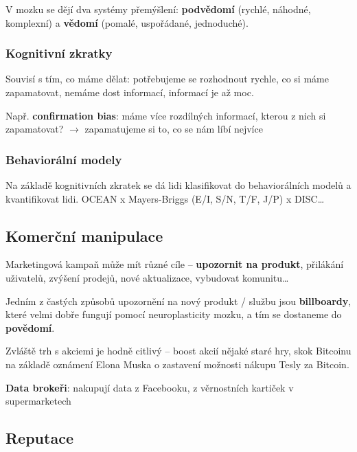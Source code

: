 V mozku se dějí dva systémy přemýšlení: \textbf{podvědomí} (rychlé, náhodné, komplexní) a \textbf{vědomí} (pomalé, uspořádané, jednoduché).

\subsubsection*{Kognitivní zkratky}

Souvisí s tím, co máme dělat: potřebujeme se rozhodnout rychle, co si máme zapamatovat, nemáme dost informací, informací je až moc.

\vspace{4pt}
\noindent Např. \textbf{confirmation bias}: máme více rozdílných informací, kterou z nich si zapamatovat? $\to$ zapamatujeme si to, co se nám líbí nejvíce

\subsubsection*{Behaviorální modely}

Na základě kognitivních zkratek se dá lidi klasifikovat do behaviorálních modelů a kvantifikovat lidi. OCEAN x Mayers-Briggs (E/I, S/N, T/F, J/P) x DISC\ldots

\subsection{Komerční manipulace}

Marketingová kampaň může mít různé cíle -- \textbf{upozornit na produkt}, přilákání uživatelů, zvýšení prodejů, nové aktualizace, vybudovat komunitu\ldots

\vspace{4pt}
\noindent Jedním z častých způsobů upozornění na nový produkt / službu jsou \textbf{billboardy}, které velmi dobře fungují pomocí neuroplasticity mozku, a tím se dostaneme do \textbf{povědomí}.

\vspace{4pt}
\noindent Zvláště trh s akciemi je hodně citlivý -- boost akcií nějaké staré hry, skok Bitcoinu na základě oznámení Elona Muska o zastavení možnosti nákupu Tesly za Bitcoin.

\vspace{4pt}
\noindent \textbf{Data brokeři}: nakupují data z Facebooku, z věrnostních kartiček v supermarketech

\subsection{Reputace}

